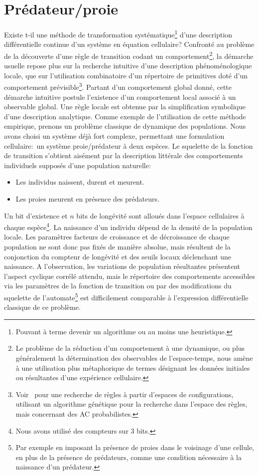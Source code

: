 \chapter{Prédateur/proie}

Existe t-il une méthode de transformation systématique\footnote{%
  Pouvant à terme devenir un algorithme ou au  moins une heuristique.} %
d'une description différentielle continue d'un système en équation
cellulaire? %
Confronté au problème de la découverte d'une règle de transition
codant un comportement\footnote{%
  Le problème de la réduction d'un comportement à une dynamique, ou
  plus gé\-né\-ra\-le\-ment la détermination des observables de
  l'espace-temps, nous amène à une utilisation plus métaphorique
  de termes désignant les données initiales ou résultantes
  d'une expérience cellulaire.}, %
la démarche usuelle repose plus sur la recherche intuitive d'une
description phénoménologique locale, que sur l'utilisation
combinatoire d'un répertoire de primitives doté d'un comportement
prévisible\footnote{%
  Voir~\cite{Richards90} pour une recherche de règles à partir
  d'espaces de configurations, utilisant un algorithme génétique pour
  la recherche dans l'espace des règles, mais concernant des AC
  probabilistes.}. %
Partant d'un comportement global donné, cette démarche intuitive
postule l'existence d'un comportement local associé à un observable
global. %
Une règle locale est obtenue par la simplification symbolique
d'une description analytique. %
Comme exemple de l'utilisation de cette méthode empirique, prenons
un problème classique de dynamique des populations. %
Nous avons choisi un système déjà fort complexe, permettant une
formulation cellulaire:~un système proie/prédateur à deux espèces. %
Le squelette de la fonction de transition s'obtient aisément par la
description littérale des comportements individuels supposés d'une
population naturelle:

\begin{itemize}
\item Les individus naissent, durent et meurent.
\item Les proies meurent en présence des prédateurs.
\end{itemize}

Un bit d'existence et $n$ bits de longévité sont alloués dans l'espace
cellulaires à chaque espèce\footnote{%
  Nous avons utilisé des compteurs sur 3 bits.}. %
La naissance d'un individu dépend de la densité de la population locale. %
Les paramètres facteurs de croissance et de décroissance de chaque
population ne sont donc pas fixés de manière absolue, mais résultent de
la conjonction du compteur de longévité et des seuils locaux
déclenchant une naissance. %
A l'observation, les variations de population résultantes présentent
l'aspect cyclique corrélé attendu, mais le répertoire des
comportements accessibles via les paramètres de la fonction de
transition ou par des modifications du squelette de
l'automate\footnote{%
  Par exemple en imposant la présence de proies dans le voisinage
  d'une cellule, en plus de la présence de prédateurs, comme une
  condition nécessaire à la naissance d'un prédateur.} %
est difficilement comparable à l'expression différentielle classique
de ce problème.

